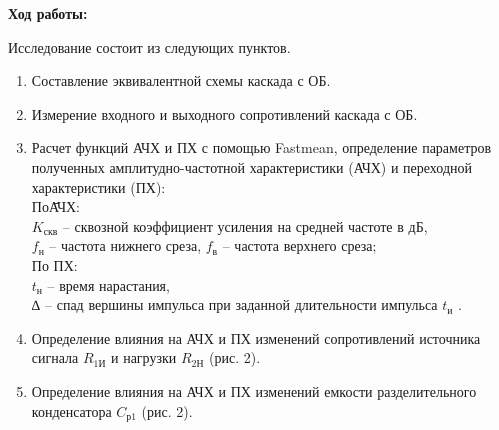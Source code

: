 \documentclass[a4paper,14pt]{extarticle}
\begin{document}
    \begin{center}
        \textbf{Ход работы:}
    \end{center}

    Исследование состоит из следующих пунктов.
    \begin{singlespace}
        \begin{enumerate}
            \item Составление эквивалентной схемы каскада с ОБ.
            \item Измерение входного и выходного сопротивлений каскада с ОБ.
            \item \begin{tabbing}
                        Расчет функций АЧХ и ПХ с помощью Fastmean, определение параметров\\ полученных амплитудно-частотной характеристики (АЧХ) и
        переходной\\ характеристики (ПХ):\\
        По\= АЧХ:\\
        \>$K_{\text{скв}}$ – сквозной коэффициент усиления на средней частоте в дБ,\\
        \>$f_{\text{н}}$ – частота нижнего среза, $f_{\text{в}}$ – частота верхнего среза;\\
        По ПХ:\\
        \>$t_{\text{н}}$ – время нарастания,\\
        \>∆ – спад вершины импульса при заданной длительности импульса $t_{\text{и}}$ .
            \end{tabbing}
            \item Определение влияния на АЧХ и ПХ изменений сопротивлений
        источника сигнала $R_{\text{1И}}$ и нагрузки $R_{\text{2Н}}$ (рис. 2).
            \item Определение влияния на АЧХ и ПХ изменений емкости разделительного
        конденсатора $C_{\text{р1}}$ (рис. 2).
        \end{enumerate}
    \end{singlespace}
\end{document}
